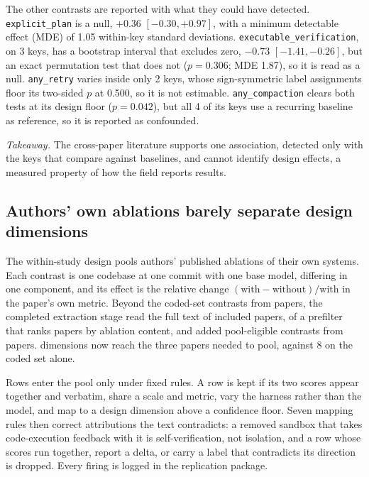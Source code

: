 The other contrasts are reported with what they could have detected. \texttt{explicit\_plan} is a null,
$+0.36$ $[-0.30, +0.97]$, with a minimum detectable effect (MDE) of 1.05 within-key standard
deviations. \texttt{executable\_verification}, on 3 keys, has a bootstrap interval that excludes zero,
$-0.73$ $[-1.41, -0.26]$, but an exact permutation test that does not ($p=0.306$; MDE 1.87), so it is
read as a null. \texttt{any\_retry} varies inside only 2 keys, whose sign-symmetric label assignments
floor its two-sided $p$ at 0.500, so it is not estimable. \texttt{any\_compaction} clears both tests at
its design floor ($p=0.042$), but all 4 of its keys use a recurring baseline as reference, so it is
reported as confounded.

\emph{Takeaway.} The cross-paper literature supports one association, detected only with the keys
that compare against baselines, and cannot identify design effects, a measured property of how the
field reports results.

\subsection{Authors' own ablations barely separate design dimensions}\label{subsec:ablations}

The within-study design pools authors' published ablations of their own systems. Each contrast is one
codebase at one commit with one base model, differing in one component, and its effect is the relative
change $(\text{with}-\text{without})/\text{with}$ in the paper's own metric. Beyond the
\rqCodedContrasts{} coded-set contrasts from \rqCodedPapers{} papers, the completed extraction stage
read the full text of \rqCorpusPapersExtracted{} included papers, \rqHarvestTierCoverage{} of a
prefilter that ranks papers by ablation content, and added \rqCorpusContrasts{} pool-eligible contrasts from \rqCorpusPapersWithContrast{}
papers. \rqPoolableDims{} dimensions now reach the three papers needed to pool, against 8 on the
coded set alone.

Rows enter the pool only under fixed rules. A row is kept if its two scores appear together and
verbatim, share a scale and metric, vary the harness rather than the model, and map to a design
dimension above a confidence floor. Seven mapping rules then correct attributions the text
contradicts: a removed sandbox that takes code-execution feedback with it is self-verification, not
isolation, and a row whose scores run together, report a delta, or carry a label that contradicts its
direction is dropped. Every firing is logged in the replication package.

